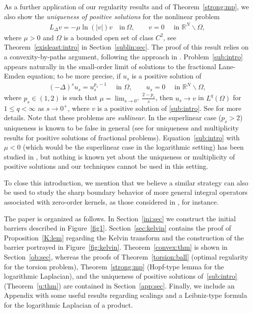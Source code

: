 \documentclass[11pt]{article}
\newcommand{\R}{\mathbb{R}}
\numberwithin{equation}{section}
\begin{document}
As a further application of our regularity results and of Theorem~\ref{strong:mp}, we also show the \emph{uniqueness of positive solutions} for the nonlinear problem 
\begin{align}\label{sub:intro}
L_{\Delta}v=-\mu\ln\left(|v|\right)v\quad\mbox{in}~\Omega,\qquad v=0\quad \text{ in }\R^N\backslash \Omega,
\end{align}
where $\mu>0$ and $\Omega$ is a bounded open set of class $C^2$, see Theorem~\ref{exisleast:intro} in Section~\ref{sublin:sec}.  The proof of this result relies on a convexity-by-paths argument, following the approach in \cite{BFMST18}. Problem~\eqref{sub:intro} appears naturally in the small-order limit of solutions to the fractional Lane-Emden equation; to be more precise, if $u_s$ is a positive solution of 
\begin{align*}
(-\Delta)^s u_s = u_s^{p_s-1}\quad \text{ in }\Omega,\qquad u_s=0\quad \text{ in }\R^N\backslash \Omega,
\end{align*}
where $p_s\in(1,2)$ is such that $\mu=\lim_{s\to 0^+}\frac{2-p_s}{s}$, then $u_s\to v$ in $L^q(\Omega)$ for $1\leq q<\infty$ as $s\to 0^+$, where $v$ is a positive solution of \eqref{sub:intro}. See \cite{AS22} for more details.  Note that these problems are \emph{sublinear}. In the superlinear case ($p_s>2$) uniqueness is known to be false in general (see \cite{davila2017bubbling,DIS23,DIS24,FW24,FW242,DP24} for uniqueness and multiplicity results for positive solutions of fractional problems). Equation~\eqref{sub:intro} with $\mu<0$ (which would be the superlinear case in the logarithmic setting) has been studied in \cite{hernandez2022small}, but nothing is known yet about the uniqueness or multiplicity of positive solutions and our techniques cannot be used in this setting. 

To close this introduction, we mention that we believe a similar strategy can also be used to study the sharp boundary behavior of more general integral operators associated with zero-order kernels, as those considered in \cite{CS22,CD18,feulefack2021nonlocal,feulefack2023fractional}, for instance.

\medskip

The paper is organized as follows. In Section~\ref{ini:sec} we construct the initial barriers described in Figure~\ref{fig1}. Section~\ref{sec:kelvin} contains the proof of Proposition~\ref{K:lem} regarding the Kelvin transform and the construction of the barrier portrayed in Figure~\ref{fig:kelvin}. Theorem~\ref{convex:thm} is shown in Section~\ref{ob:sec}, whereas
the proofs of Theorem~\ref{torsion:ball} (optimal regularity for the torsion problem), Theorem~\ref{strong:mp} (Hopf-type lemma for the logarithmic Laplacian), and the uniqueness of positive solutions of~\eqref{sub:intro} (Theorem~\ref{u:thm}) are contained in Section~\ref{app:sec}.  Finally, we include an Appendix with some useful results regarding scalings and a Leibniz-type formula for the logarithmic Laplacian of a product. 
\end{document}
